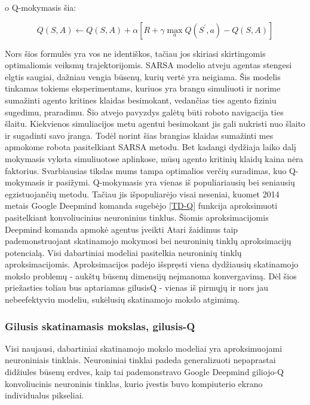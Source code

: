 \documentclass[a4paper, 12pt]{article}
\begin{document}
o Q-mokymasis šia:

\begin{equation}
\label{TD-Q}
Q(S, A) \leftarrow Q(S, A)+\alpha\left[R+\gamma \max _{a} Q\left(S^{\prime}, a\right)-Q(S, A)\right]
\end{equation}

Nors šios formulės yra vos ne identiškos, tačiau jos skiriasi skirtingomis optimaliomis veiksmų trajektorijomis. SARSA modelio atveju agentas stengesi elgtis saugiai, dažniau vengia būsenų, kurių vertė yra neigiama. Šis modelis tinkamas tokiems eksperimentams, kuriuos yra brangu simuliuoti ir norime sumažinti agento kritines klaidas besimokant, vedančias ties agento fiziniu sugedimu, praradimu. Šio atvejo pavyzdys galėtų būti roboto navigacija ties šlaitu. Kiekvienos simuliacijos metu agentui besimokant jis gali nukristi nuo šlaito ir sugadinti savo įranga. Todėl norint šias brangias klaidas sumažinti mes apmokome robota pasitelkiant SARSA metodu. Bet kadangi dydžiaja laiko dalį mokymasis vyksta simuliuotose aplinkose, mūsų agento kritinių klaidų kaina nėra faktorius. Svarbiausias tikslas mums tampa optimalios verčių suradimas, kuo Q-mokymasis ir pasižymi. Q-mokymasis \cite{QLearning} yra vienas iš populiariausių bei seniausių egzistuojančių metodu. Tačiau jis išpopuliarėjo visai neseniai, kuomet 2014 metais Google Deepmind komanda sugebėjo \ref{TD-Q} funkcija aproksimuoti pasitelkiant konvoliucinius neuroninius tinklus. Šiomis aproksimacijomis Deepmind komanda apmokė agentus įveikti Atari žaidimus taip pademonstruojant skatinamojo mokymosi bei neuroninių tinklų aproksimacijų potencialą. Visi dabartiniai modeliai pasitelkia neuroninių tinklų aproksimacijomis. Aproksimacijos padėjo išspręsti viena dydžiausių skatinamojo mokslo problemų - aukštų būsenų dimensijų neįmanoma konvergavimą. Dėl šios priežasties toliau bus aptariamas gilusisQ - vienas iš pirmųjų ir nors jau nebeefektyviu modeliu, sukėlusių skatinamojo mokslo atgimimą.

\subsubsection{Gilusis skatinamasis mokslas, gilusis-Q}
\label{GilusisQSkyrius}
Visi naujausi, dabartiniai skatinamojo mokslo modeliai yra aproksimuojami neuroniniais tinklais. Neuroniniai tinklai padeda generalizuoti nepaprastai didžiules būsenų erdves, kaip tai pademonstravo Google Deepmind giliojo-Q konvoliucinis neuroninis tinklas, kurio įvestis buvo kompiuterio ekrano individualus pikseliai. 
\end{document}
